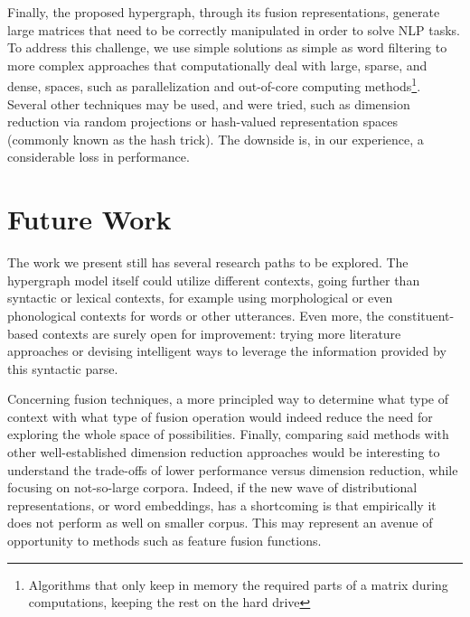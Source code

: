 Finally, the proposed hypergraph, through its fusion representations, generate large matrices that need to be correctly manipulated in order to solve NLP tasks. To address this challenge, we use simple solutions as simple as word filtering to more complex approaches that computationally deal with large, sparse, and dense, spaces, such as parallelization and out-of-core computing methods\footnote{Algorithms that only keep in memory the required parts of a matrix during computations, keeping the rest on the hard drive}. Several other techniques may be used, and were tried, such as dimension reduction via random projections or hash-valued  representation spaces (commonly known as the hash trick). The downside is, in our experience, a considerable loss in performance.


\section{Future Work}
The work we present still has several research paths to be explored.
The hypergraph model itself could utilize different contexts, going further than syntactic or lexical contexts, for example using morphological or even phonological contexts for words or other utterances. Even more, the constituent-based contexts are surely open for improvement: trying more literature approaches or devising intelligent ways to leverage the information provided by this syntactic parse.


Concerning fusion techniques, a more principled way to determine what type of context with what type of fusion operation would indeed reduce the need for exploring the whole space of possibilities. Finally,  comparing said methods with other well-established dimension reduction approaches would be interesting to understand the trade-offs of lower performance versus dimension reduction, while focusing on not-so-large corpora. Indeed, if the new wave of distributional representations, or word embeddings, has a shortcoming is that empirically it does not perform as well on smaller corpus. This may represent an avenue of opportunity to methods such as feature fusion functions.


